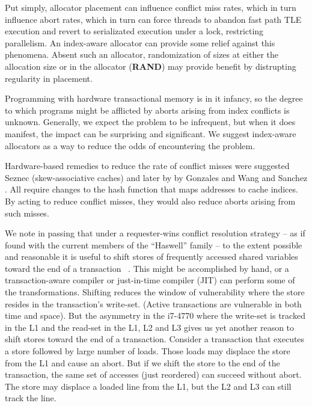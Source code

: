 \documentclass[preprint]{sigplanconf}
\begin{document}
Put simply, allocator placement can influence conflict miss rates, which
in turn influence abort rates, which in turn can force threads to abandon
fast path TLE execution and revert to serializated execution under a lock,
restricting parallelism.  An index-aware allocator can provide some relief
against this phenomena.  Absent such an allocator, randomization of sizes
at either the allocation size or in the allocator (\textbf{RAND}) may provide 
benefit by distrupting regularity in placement.  

Programming with hardware transactional memory is in it infancy, so the 
degree to which programs might be afflicted by aborts arising from
index conflicts is unknown.  Generally, we expect the problem to be infrequent,
but when it does manifest, the impact can be surprising and significant.  We 
suggest index-aware allocators as a way to reduce the odds of encountering
the problem.  

Hardware-based remedies to reduce the rate of conflict misses were suggested          
Seznec \cite{SkewAssociative} (skew-associative caches) and later by                 
by Gonzales \cite{263599} and Wang \cite{NewCache} and Sanchez \cite{ZCache}. 
All require changes to the hash function that maps addresses to cache indices. 
By acting to reduce conflict misses, they would also reduce aborts arising
from such misses. 

We note in passing that under a requester-wins conflict resolution strategy --
as if found with the current members of the ``Haswell'' family -- to the extent 
possible and reasonable it is useful to shift stores of frequently 
accessed shared variables toward the end of a transaction ~\cite{Shifting}.  
This might be accomplished by hand, or a transaction-aware compiler or just-in-time
compiler (JIT) can perform 
some of the transformations.  Shifting reduces the window of vulnerability 
where the store resides in the transaction's write-set. (Active transactions
are vulnerable in both time and space).  But the asymmetry in 
the i7-4770 where the write-set is tracked in the L1 and the read-set in the 
L1, L2 and L3 gives us yet another reason to shift stores toward the end of a 
transaction. Consider a transaction that executes a store followed by large 
number of loads. Those loads may displace the store from the L1 and cause an abort. But if 
we shift the store to the end of the transaction, the same set of accesses 
(just reordered) can succeed without abort. The store may displace a loaded 
line from the L1, but the L2 and L3 can still track the line. 









 
  
\end{document}
